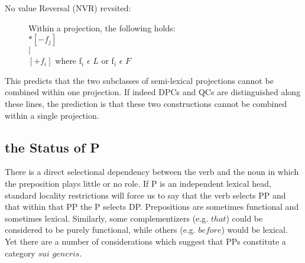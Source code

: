 \documentclass{article}
\begin{document}
\begin{example}
\begin{description}
\item[No value Reversal (NVR) revsited: ]
Within a projection, the following holds:\\
$*[-f_{j}]$\\
$|$\\
$[+f_{i}]$ where f$_{i}$ $\epsilon$ ${L}$ or f$_{i}$ $\epsilon$ ${F}$
\end{description}
\end{example}
This predicts that the two subclasses of semi-lexical projections cannot be combined within one projection. If indeed DPCs and QCs are distinguished along these lines, the prediction is that these two constructions cannot be combined within a single projection.

\subsection{the Status of P}
There is a direct selectional dependency between the verb and the noun in which the preposition plays little or no role. If P is an independent lexical head, standard locality restrictions will force us to say that the verb selects PP and that within that PP the P selects DP. Prepositions are sometimes functional and sometimes lexical. Similarly, some complementizers (e.g. $that$) could be considered to be purely functional, while others (e.g. $before$) would be lexical. Yet there are a number of considerations which suggest that PPs constitute a category $sui$ $generis$.
\end{document}
